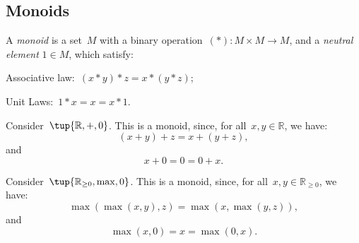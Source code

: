 \subsection{Monoids}
\begin{definition}[Monoid]
A \emph{monoid} is a set~$M$ with a binary operation~$(*)\colon M\times M\to M$, and a \emph{neutral element} $1\in M$, which satisfy:
\begin{compactenum}
        \item Associative law:~$(x* y)* z=x* (y* z)$;
        \item Unit Laws:~$1* x=x=x* 1$.
\end{compactenum}
\end{definition}
\begin{example}
Consider~$\tup{\mathbb{R},+,0}$. This is a monoid, since, for all~$x,y\in \mathbb{R}$, we have:
\begin{equation*}
    (x+y)+z=x+(y+z),
\end{equation*}
and
\begin{equation*}
    x+0=0=0+x.
\end{equation*}
\end{example}

\begin{example}
Consider~$\tup{\mathbb{R}_{\geq0},\max,0}$. This is a monoid, since, for all~$x,y\in \mathbb{R}_{\geq0}$, we have:
\begin{equation*}
    \max(\max(x,y),z)=\max(x,\max(y,z)),
\end{equation*}
and
\begin{equation*}
    \max(x,0)=x=\max(0,x).
\end{equation*}
\end{example}


